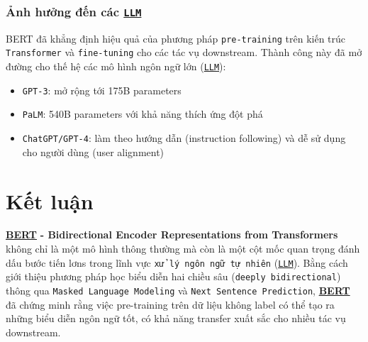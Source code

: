 \subsubsection{Ảnh hưởng đến các \hyperref[acro:llm]{\texttt{LLM}}}
BERT đã khẳng định hiệu quả của phương pháp \texttt{pre-training} trên kiến trúc \texttt{Transformer} và \texttt{fine-tuning} cho các tác vụ downstream. Thành công này đã mở đường cho thế hệ các mô hình ngôn ngữ lớn (\hyperref[acro:llm]{\texttt{LLM}}):
\begin{itemize}
    \item \texttt{GPT-3}: mở rộng tới 175B parameters
    \item \texttt{PaLM}: 540B parameters với khả năng thích ứng đột phá
    \item \texttt{ChatGPT/GPT-4}: làm theo hướng dẫn (instruction following) và dễ sử dụng cho người dùng (user alignment)
\end{itemize}

\section{Kết luận}
\label{sec:ket_luan}

\hyperref[acro:bert]{\textbf{BERT}} \textbf{- Bidirectional Encoder Representations from Transformers} \cite{devlin2018bert} không chỉ là một mô hình thông thường mà còn là một cột mốc quan trọng đánh dấu bước tiến lơns trong lĩnh vực \texttt{xử lý ngôn ngữ tự nhiên} (\hyperref[acro:llm]{\texttt{LLM}}). Bằng cách giới thiệu phương pháp học biểu diễn hai chiều sâu (\texttt{deeply bidirectional}) thông qua \texttt{Masked Language Modeling} và \texttt{Next Sentence Prediction}, \hyperref[acro:bert]{\textbf{BERT}} đã chứng minh rằng việc pre-training trên dữ liệu không label có thể tạo ra những biểu diễn ngôn ngữ tốt, có khả năng transfer xuất sắc cho nhiều tác vụ downstream.

